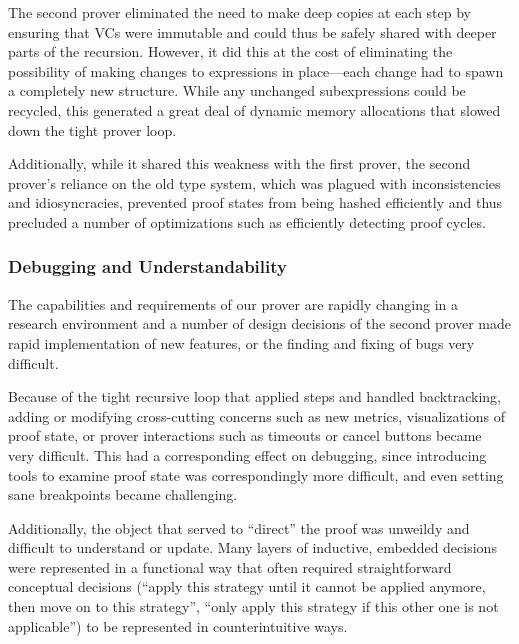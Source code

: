 The second prover eliminated the need to make deep copies at each step by ensuring that VCs were immutable and could thus be safely shared with deeper parts of the recursion.  However, it did this at the cost of eliminating the possibility of making changes to expressions in place---each change had to spawn a completely new structure.  While any unchanged subexpressions could be recycled, this generated a great deal of dynamic memory allocations that slowed down the tight prover loop.

Additionally, while it shared this weakness with the first prover, the second prover's reliance on the old type system, which was plagued with inconsistencies and idiosyncracies, prevented proof states from being hashed efficiently and thus precluded a number of optimizations such as efficiently detecting proof cycles.

		\subsubsection{Debugging and Understandability}

The capabilities and requirements of our prover are rapidly changing in a research environment and a number of design decisions of the second prover made rapid implementation of new features, or the finding and fixing of bugs very difficult.

Because of the tight recursive loop that applied steps and handled backtracking, adding or modifying cross-cutting concerns such as new metrics, visualizations of proof state, or prover interactions such as timeouts or cancel buttons became very difficult.  This had a corresponding effect on debugging, since introducing tools to examine proof state was correspondingly more difficult, and even setting sane breakpoints became challenging.

Additionally, the object that served to ``direct'' the proof was unweildy and difficult to understand or update.  Many layers of inductive, embedded decisions were represented in a functional way that often required straightforward conceptual decisions (``apply this strategy until it cannot be applied anymore, then move on to this strategy'', ``only apply this strategy if this other one is not applicable'') to be represented in counterintuitive ways.

